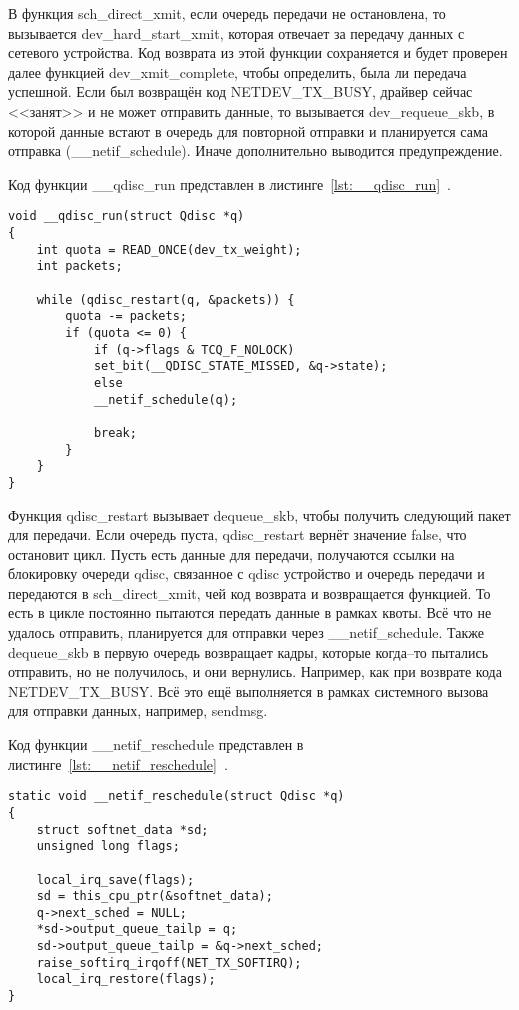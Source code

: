 В функция sch\_direct\_xmit, если очередь передачи не остановлена, то вызывается dev\_hard\_start\_xmit, которая отвечает за передачу данных с сетевого устройства. Код возврата из этой функции сохраняется и будет проверен далее функцией dev\_xmit\_complete, чтобы определить, была ли передача успешной. Если был возвращён код NETDEV\_TX\_BUSY, драйвер сейчас <<занят>> и не может отправить данные, то вызывается dev\_requeue\_skb, в которой данные встают в очередь для повторной отправки и планируется сама отправка (\_\_netif\_schedule). Иначе дополнительно выводится предупреждение.

Код функции \_\_qdisc\_run представлен в листинге~\ref{lst:__qdisc_run}~\cite{qdisc_run}.
\begin{center}
	\captionsetup{justification=raggedright,singlelinecheck=off}
	\begin{lstlisting}[label=lst:__qdisc_run,caption=Функция \_\_qdisc\_run,showstringspaces=false]
void __qdisc_run(struct Qdisc *q)
{
	int quota = READ_ONCE(dev_tx_weight);
	int packets;
	
	while (qdisc_restart(q, &packets)) {
		quota -= packets;
		if (quota <= 0) {
			if (q->flags & TCQ_F_NOLOCK)
			set_bit(__QDISC_STATE_MISSED, &q->state);
			else
			__netif_schedule(q);
			
			break;
		}
	}
}
	\end{lstlisting}
\end{center}
\FloatBarrier

Функция qdisc\_restart вызывает dequeue\_skb, чтобы получить следующий пакет для передачи. Если очередь пуста, qdisc\_restart вернёт значение false, что остановит цикл. Пусть есть данные для передачи, получаются ссылки на блокировку очереди qdisc, связанное с qdisc устройство и очередь передачи и передаются в sch\_direct\_xmit, чей код возврата и возвращается функцией. То есть в цикле постоянно пытаются передать данные в рамках квоты. Всё что не удалось отправить, планируется для отправки через \_\_netif\_schedule. Также dequeue\_skb в первую очередь возвращает кадры, которые когда--то пытались отправить, но не получилось, и они вернулись. Например, как при возврате кода NETDEV\_TX\_BUSY. Всё это ещё выполняется в рамках системного вызова для отправки данных, например, sendmsg.

Код функции \_\_netif\_reschedule представлен в листинге~\ref{lst:__netif_reschedule}~\cite{netif_reschedule}.
\begin{center}
	\captionsetup{justification=raggedright,singlelinecheck=off}
	\begin{lstlisting}[label=lst:__netif_reschedule,caption=Функция \_\_netif\_reschedule,showstringspaces=false]
static void __netif_reschedule(struct Qdisc *q)
{
	struct softnet_data *sd;
	unsigned long flags;
	
	local_irq_save(flags);
	sd = this_cpu_ptr(&softnet_data);
	q->next_sched = NULL;
	*sd->output_queue_tailp = q;
	sd->output_queue_tailp = &q->next_sched;
	raise_softirq_irqoff(NET_TX_SOFTIRQ);
	local_irq_restore(flags);
}
	\end{lstlisting}
\end{center}
\FloatBarrier

